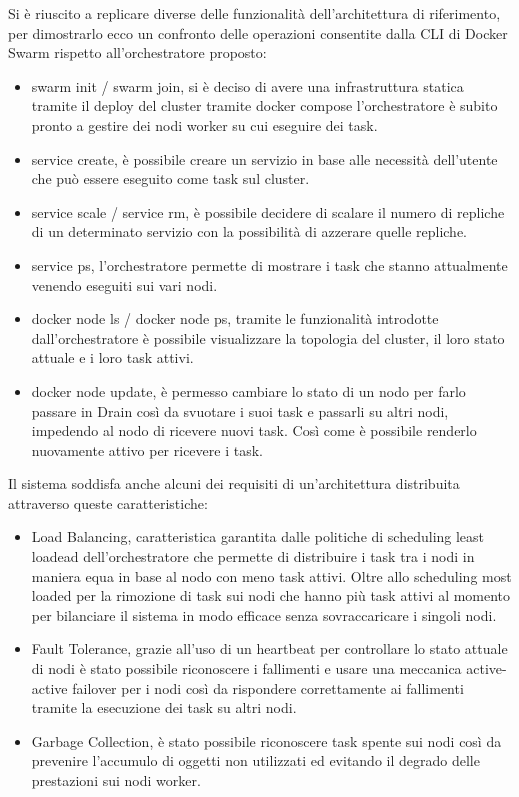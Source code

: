 \documentclass[12pt,a4paper]{article}
\begin{document}
Si è riuscito a replicare diverse delle funzionalità dell'architettura di riferimento, per dimostrarlo ecco un confronto delle operazioni consentite dalla CLI di Docker Swarm rispetto all'orchestratore proposto:
\begin{itemize}
    \item swarm init / swarm join, si è deciso di avere una infrastruttura statica tramite il deploy del cluster tramite docker compose l'orchestratore è subito pronto a gestire dei nodi worker su cui eseguire dei task. 
    \item service create, è possibile creare un servizio in base alle necessità dell'utente che può essere eseguito come task sul cluster.
    \item service scale / service rm, è possibile decidere di scalare il numero di repliche di un determinato servizio con la possibilità di azzerare quelle repliche.
    \item service ps, l'orchestratore permette di mostrare i task che stanno attualmente venendo eseguiti sui vari nodi.
    \item docker node ls / docker node ps, tramite le funzionalità introdotte dall'orchestratore è possibile visualizzare la topologia del cluster, il loro stato attuale e i loro task attivi. 
    \item docker node update, è permesso cambiare lo stato di un nodo per farlo passare in Drain così da svuotare i suoi task e passarli su altri nodi, impedendo al nodo di ricevere nuovi task. Così come è possibile renderlo nuovamente attivo per ricevere i task.
\end{itemize}

Il sistema soddisfa anche alcuni dei requisiti di un'architettura distribuita attraverso queste caratteristiche:
\begin{itemize}
    \item Load Balancing, caratteristica garantita dalle politiche di scheduling least loadead dell'orchestratore che permette di distribuire i task tra i nodi in maniera equa in base al nodo con meno task attivi. Oltre allo scheduling most loaded per la rimozione di task sui nodi che hanno più task attivi al momento per bilanciare il sistema in modo efficace senza sovraccaricare i singoli nodi.
    \item Fault Tolerance, grazie all'uso di un heartbeat per controllare lo stato attuale di nodi è stato possibile riconoscere i fallimenti e usare una meccanica active-active failover per i nodi così da rispondere correttamente ai fallimenti tramite la esecuzione dei task su altri nodi.
    \item Garbage Collection, è stato possibile riconoscere task spente sui nodi così da prevenire l'accumulo di oggetti non utilizzati ed evitando il degrado delle prestazioni sui nodi worker.
\end{itemize}
\end{document}
